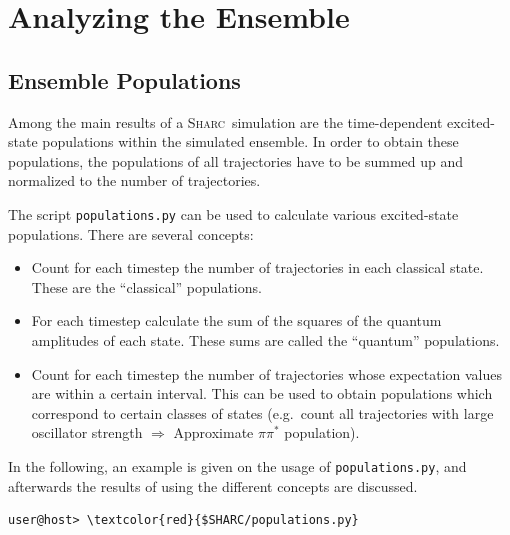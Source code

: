 \documentclass[a4paper,11pt,DIV=15,openany]{scrbook}
\newcommand{\sharc}{\textsc{Sharc}}
\newcommand{\ttt}[1]{\texttt{#1}}
\begin{document}
\clearpage
\section{Analyzing the Ensemble}

\subsection{Ensemble Populations}

Among the main results of a \sharc\ simulation are the time-dependent excited-state populations within the simulated ensemble. In order to obtain these populations, the populations of all trajectories have to be summed up and normalized to the number of trajectories.

The script \ttt{populations.py} can be used to calculate various excited-state populations. There are several concepts:
\begin{itemize}
  \item Count for each timestep the number of trajectories in each classical state. These are the ``classical'' populations.
  \item For each timestep calculate the sum of the squares of the quantum amplitudes of each state. These sums are called the ``quantum'' populations.
  \item Count for each timestep the number of trajectories whose expectation values are within a certain interval. This can be used to obtain populations which correspond to certain classes of states (e.g.\ count all trajectories with large oscillator strength $\Rightarrow$ Approximate $\pi\pi^*$ population).
\end{itemize}

In the following, an example is given on the usage of \ttt{populations.py}, and afterwards the results of using the different concepts are discussed.

\begin{Verbatim}[commandchars=\\\{\}]
user@host> \textcolor{red}{$SHARC/populations.py}
\end{Verbatim}
\end{document}
